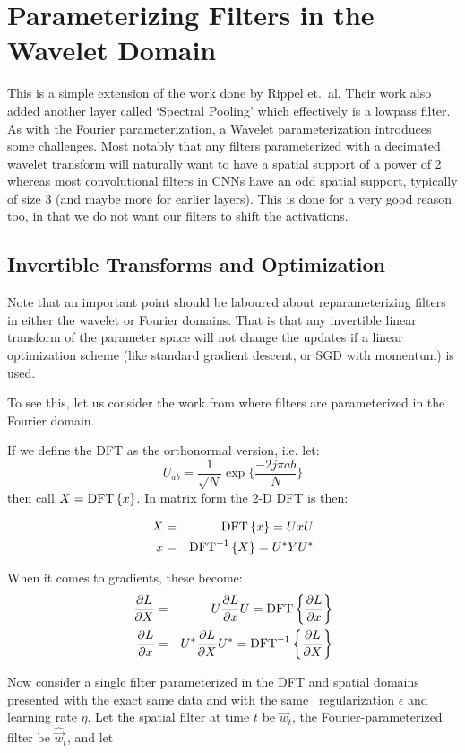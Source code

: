 \section{Parameterizing Filters in the Wavelet Domain}\label{sec:ch6:reparameterization}
This is a simple extension of the work done by Rippel et.\ al. Their work also
added another layer called `Spectral Pooling' which effectively is a lowpass
filter. As with the Fourier parameterization, a Wavelet parameterization
introduces some challenges. Most notably that any filters parameterized with a
decimated wavelet transform will naturally want to have a spatial support of a
power of 2 whereas most convolutional filters in CNNs have an odd spatial
support, typically of size 3 (and maybe more for earlier layers). This is done
for a very good reason too, in that we do not want our filters to shift the
activations. 

\subsection{Invertible Transforms and Optimization}
Note that an important point should be laboured about reparameterizing filters
in either the wavelet or Fourier domains. That is that any invertible linear
transform of the parameter space will not change the updates if a linear
optimization scheme (like standard gradient descent, or SGD with momentum) is
used.

To see this, let us consider the work from \cite{rippel_spectral_2015} where
filters are parameterized in the Fourier domain. 

If we define the DFT as the orthonormal version, i.e. let:
$$ U_{ab} = \frac{1}{\sqrt{N}} \exp\{ \frac{-2j\pi ab}{N} \} $$
%
then call $X = \mathrm{DFT}\left\{x\right\}$. In matrix form the 2-D DFT is then:

\begin{eqnarray}
  X &=& \mathrm{DFT}\left\{x\right\} = UxU \\
  x &=& \mathrm{DFT}^{-1}\left\{X\right\} = U^*YU^* 
\end{eqnarray}

When it comes to gradients, these become:
\begin{eqnarray}
  \frac{\partial L}{\partial X} &=& U \frac{\partial L}{\partial x} U = \mathrm{DFT}\left\{\frac{\partial L}{\partial x}\right\} \label{eq:ch6:dft_grad}\\
  \frac{\partial L}{\partial x} &=& U^* \frac{\partial L}{\partial X} U^* = \mathrm{DFT}^{-1}\left\{\frac{\partial L}{\partial X}\right\}
\end{eqnarray}

Now consider a single filter parameterized in the DFT and spatial domains
presented with the exact same data and with the same \ltwo\ regularization
$\epsilon$ and learning rate $\eta$. Let
the spatial filter at time $t$ be $\vec{w}_t$, the Fourier-parameterized
filter be $\hat{\vec{w}}_t$, and let 

